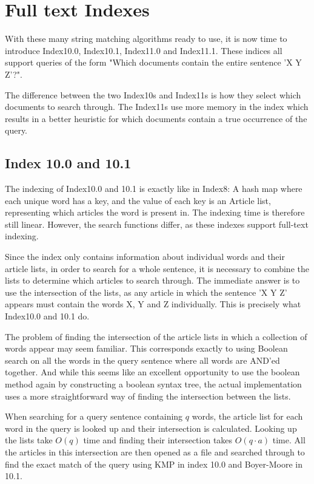 \section{Full text Indexes}\label{sec:index10}

With these many string matching algorithms ready to use, it is now time to introduce Index10.0, Index10.1, Index11.0 and Index11.1. These indices all support queries of the form "Which documents contain the entire sentence 'X Y Z'?". 

The difference between the two Index10s and Index11s is how they select which documents to search through. The Index11s use more memory in the index which results in a better heuristic for which documents contain a true occurrence of the query. 

\subsection{Index 10.0 and 10.1}
The indexing of Index10.0 and 10.1 is exactly like in Index8: A hash map where each unique word has a key, and the value of each key is an Article list, representing which articles the word is present in. The indexing time is therefore still linear. However, the search functions differ, as these indexes support full-text indexing.

Since the index only contains information about individual words and their article lists, in order to search for a whole sentence, it is necessary to combine the lists to determine which articles to search through. The immediate answer is to use the intersection of the lists, as any article in which the sentence 'X Y Z' appears must contain the words X, Y and Z individually. This is precisely what Index10.0 and 10.1 do. 

The problem of finding the intersection of the article lists in which a collection of words appear may seem familiar. This corresponds exactly to using Boolean search on all the words in the query sentence where all words are AND'ed together. And while this seems like an excellent opportunity to use the boolean method again by constructing a boolean syntax tree, the actual implementation uses a more straightforward way of finding the intersection between the lists. 

When searching for a query sentence containing $q$ words, the article list for each word in the query is looked up and their intersection is calculated. Looking up the lists take $O(q)$ time and finding their intersection takes $O(q\cdot a)$ time. All the articles in this intersection are then opened as a file and searched through to find the exact match of the query using KMP in index 10.0 and Boyer-Moore in 10.1. 

